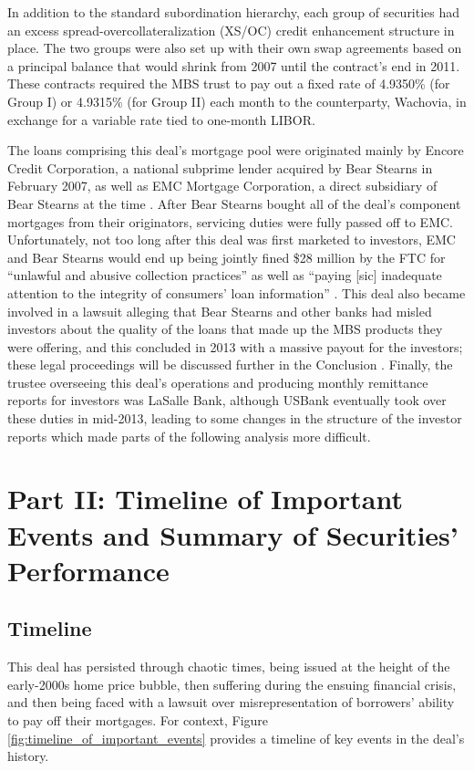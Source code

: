 \documentclass[12pt]{article}
\begin{document}
In addition to the standard subordination hierarchy, each group of securities had an excess spread-overcollateralization (XS/OC) credit enhancement structure in place. The two groups were also set up with their own swap agreements based on a principal balance that would shrink from 2007 until the contract’s end in 2011. These contracts required the MBS trust to pay out a fixed rate of 4.9350\% (for Group I) or 4.9315\% (for Group II) each month to the counterparty, Wachovia, in exchange for a variable rate tied to one-month LIBOR.

The loans comprising this deal's mortgage pool were originated mainly by Encore Credit Corporation, a national subprime lender acquired by Bear Stearns in February 2007, as well as EMC Mortgage Corporation, a direct subsidiary of Bear Stearns at the time \parencite{cpi09}.  After Bear Stearns bought all of the deal’s component mortgages from their originators, servicing duties were fully passed off to EMC. Unfortunately, not too long after this deal was first marketed to investors, EMC and Bear Stearns would end up being jointly fined \$28 million by the FTC for “unlawful and abusive collection practices” as well as “paying [sic] inadequate attention to the integrity of consumers’ loan information” \parencite{ftc08}. This deal also became involved in a lawsuit alleging that Bear Stearns and other banks had misled investors about the quality of the loans that made up the MBS products they were offering, and this concluded in 2013 with a massive payout for the investors; these legal proceedings will be discussed further in the Conclusion \parencite{doj13}. Finally, the trustee overseeing this deal’s operations and producing monthly remittance reports for investors was LaSalle Bank, although USBank eventually took over these duties in mid-2013, leading to some changes in the structure of the investor reports which made parts of the following analysis more difficult.

\section*{Part II: Timeline of Important Events and Summary of Securities' Performance}

\subsection*{Timeline}

This deal has persisted through chaotic times, being issued at the height of the early-2000s home price bubble, then suffering during the ensuing financial crisis, and then being faced with a lawsuit over misrepresentation of borrowers’ ability to pay off their mortgages. For context, Figure \ref{fig:timeline_of_important_events} provides a timeline of key events in the deal’s history.
\end{document}
